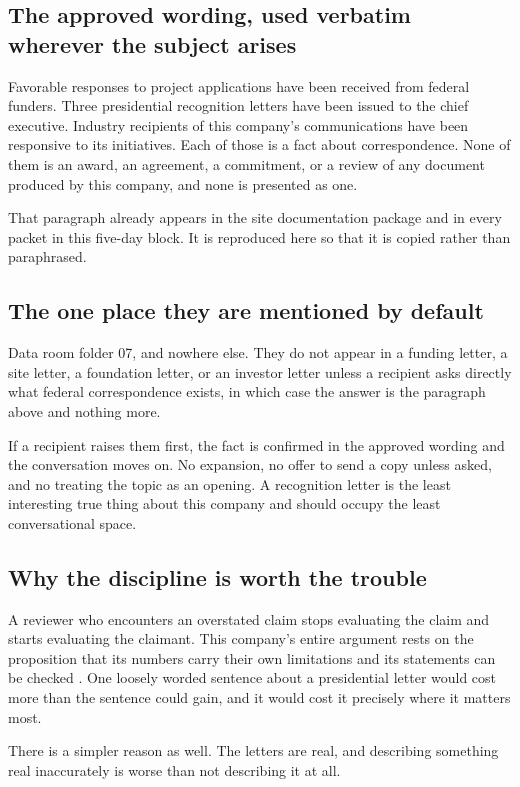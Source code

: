 \subsection{The approved wording, used verbatim wherever the subject arises}

Favorable responses to project applications have been received from federal
funders. Three presidential recognition letters have been issued to the chief
executive. Industry recipients of this company's communications have been
responsive to its initiatives. Each of those is a fact about correspondence. None
of them is an award, an agreement, a commitment, or a review of any document
produced by this company, and none is presented as one.

That paragraph already appears in the site documentation package
\cite{movein2026} and in every packet in this five-day block. It is reproduced
here so that it is copied rather than paraphrased.

\subsection{The one place they are mentioned by default}

Data room folder 07, and nowhere else. They do not appear in a funding letter, a
site letter, a foundation letter, or an investor letter unless a recipient asks
directly what federal correspondence exists, in which case the answer is the
paragraph above and nothing more.

If a recipient raises them first, the fact is confirmed in the approved wording
and the conversation moves on. No expansion, no offer to send a copy unless
asked, and no treating the topic as an opening. A recognition letter is the least
interesting true thing about this company and should occupy the least
conversational space.

\subsection{Why the discipline is worth the trouble}

A reviewer who encounters an overstated claim stops evaluating the claim and
starts evaluating the claimant. This company's entire argument rests on the
proposition that its numbers carry their own limitations and its statements can
be checked \cite{capitalplan2026}. One loosely worded sentence about a
presidential letter would cost more than the sentence could gain, and it would
cost it precisely where it matters most.

There is a simpler reason as well. The letters are real, and describing something
real inaccurately is worse than not describing it at all.
